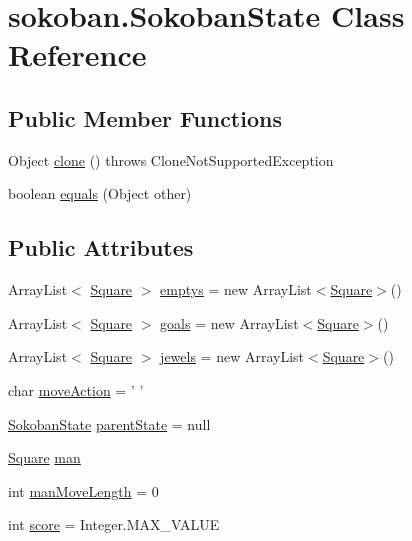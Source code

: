 \hypertarget{classsokoban_1_1SokobanState}{
\section{sokoban.SokobanState Class Reference}
\label{classsokoban_1_1SokobanState}
}
\subsection*{Public Member Functions}
\begin{CompactItemize}
\item 
Object \hyperlink{classsokoban_1_1SokobanState_5b0af9f529a44194f85d5a97e4d30e8b}{clone} ()  throws CloneNotSupportedException 	
\item 
boolean \hyperlink{classsokoban_1_1SokobanState_dd4ab81e98ebfe61728e86601714e782}{equals} (Object other)
\end{CompactItemize}
\subsection*{Public Attributes}
\begin{CompactItemize}
\item 
ArrayList$<$ \hyperlink{classsokoban_1_1Square}{Square} $>$ \hyperlink{classsokoban_1_1SokobanState_fccb278bd378b05c43629c11b1de98c4}{emptys} = new ArrayList$<$\hyperlink{classsokoban_1_1Square}{Square}$>$()
\item 
ArrayList$<$ \hyperlink{classsokoban_1_1Square}{Square} $>$ \hyperlink{classsokoban_1_1SokobanState_5b927bad859e4dfb75c47b81332025f7}{goals} = new ArrayList$<$\hyperlink{classsokoban_1_1Square}{Square}$>$()
\item 
ArrayList$<$ \hyperlink{classsokoban_1_1Square}{Square} $>$ \hyperlink{classsokoban_1_1SokobanState_c99af6c76d7bb97a3f9a4cb99941b191}{jewels} = new ArrayList$<$\hyperlink{classsokoban_1_1Square}{Square}$>$()
\item 
char \hyperlink{classsokoban_1_1SokobanState_e455b73090c57748fed538fb3db38bad}{moveAction} = ' '
\item 
\hyperlink{classsokoban_1_1SokobanState}{SokobanState} \hyperlink{classsokoban_1_1SokobanState_0fb6fdf320205ecfa94458777874c528}{parentState} = null
\item 
\hyperlink{classsokoban_1_1Square}{Square} \hyperlink{classsokoban_1_1SokobanState_64bdc705128d80106207c569ee46d2e7}{man}
\item 
int \hyperlink{classsokoban_1_1SokobanState_2debe85c8a268de2b87615abceec728a}{manMoveLength} = 0
\item 
int \hyperlink{classsokoban_1_1SokobanState_b55163b3cfa5a1936b8d1b9355668f0a}{score} = Integer.MAX\_\-VALUE
\end{CompactItemize}
